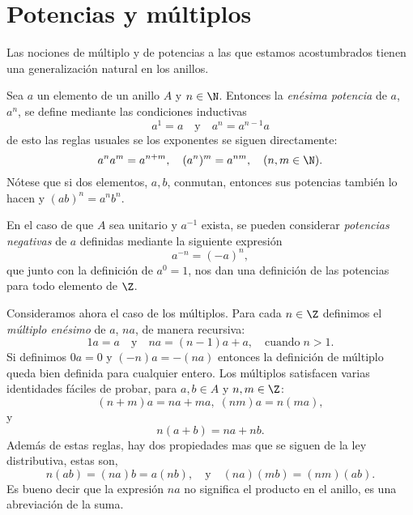 \section{Potencias y múltiplos}
\noindent Las nociones de múltiplo y de potencias a las que estamos acostumbrados tienen una generalización natural en los anillos.

Sea $a$ un elemento de un anillo $A$ y $n \in \N$. Entonces la \textit{enésima potencia} de $a$, $a^n$, se define mediante las condiciones inductivas  
\[ a^1=a \quad \text{y} \quad a^n=a^{n-1}a \] 
de esto las reglas usuales se los exponentes se siguen directamente:
\[ a^na^m=a^{n+m}, \quad (a^n)^m = a^{nm}, \quad (n,m \in \N). \]
Nótese que si dos elementos, $a,b$, conmutan, entonces sus potencias también lo hacen y $(ab)^n = a^nb^n$. 

En el caso de que $A$ sea unitario y $a^{-1}$ exista, se pueden considerar \textit{potencias negativas} de $a$ definidas mediante la siguiente expresión
\[ a^{-n} = (-a)^n, \]
que junto con la definición de $a^0=1$, nos dan una definición de las potencias para todo elemento de $\Z$.


Consideramos ahora el caso de los múltiplos. Para cada $n \in \Z$ definimos el \textit{múltiplo enésimo} de $a$, $na$, de manera recursiva:
\[ 1a=a \quad \text{y} \quad na=(n-1)a+a, \quad \text{cuando} \; n>1. \]
%
Si definimos $0a=0$ y $(-n)a = -(na)$ entonces la definición de múltiplo queda bien definida para cualquier entero. Los múltiplos satisfacen varias identidades fáciles de probar, para $a,b \in A$ y $n,m \in \Z$:
\[ (n+m)a = na + ma,\; (nm)a = n(ma), \]
y
\[n(a+b) = na+nb.\]  
%
Además de estas reglas, hay dos propiedades mas que se siguen de la ley distributiva, estas son,
\[ n(ab) = (na)b = a(nb), \quad \text{y} \quad (na)(mb) = (nm)(ab). \]
%
Es bueno decir que la expresión $na$ no significa el producto en el anillo, es una abreviación de la  suma.
